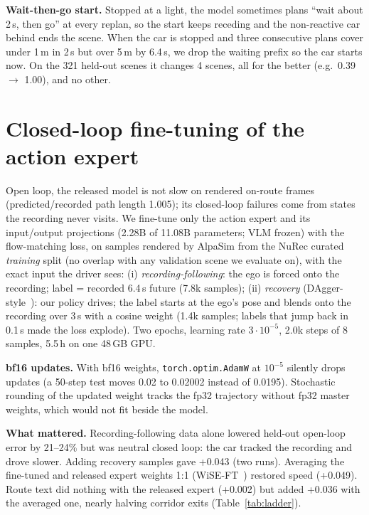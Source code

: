 \documentclass{article}
\begin{document}
\textbf{Wait-then-go start.} Stopped at a light, the model sometimes plans ``wait about 2\,s, then go'' at every replan,
so the start keeps receding and the non-reactive car behind ends the scene. When the car is stopped and three
consecutive plans cover under 1\,m in 2\,s but over 5\,m by 6.4\,s, we drop the waiting prefix so the car starts now.
On the 321 held-out scenes it changes 4 scenes, all for the better (e.g.\ 0.39 $\rightarrow$ 1.00), and no other.

\section{Closed-loop fine-tuning of the action expert}
Open loop, the released model is not slow on rendered on-route frames (predicted/recorded path length 1.005); its
closed-loop failures come from states the recording never visits. We fine-tune only the action expert and its
input/output projections (2.28B of 11.08B parameters; VLM frozen) with the flow-matching loss, on samples rendered by
AlpaSim from the NuRec curated \emph{training} split (no overlap with any validation scene we evaluate on), with the
exact input the driver sees:
(i) \emph{recording-following}: the ego is forced onto the recording; label = recorded 6.4\,s future (7.8k samples);
(ii) \emph{recovery} (DAgger-style~\cite{dagger}): our policy drives; the label starts at the ego's pose and blends onto
the recording over 3\,s with a cosine weight (1.4k samples; labels that jump back in 0.1\,s made the loss explode).
Two epochs, learning rate $3\cdot10^{-5}$, 2.0k steps of 8 samples, 5.5\,h on one 48\,GB GPU.

\textbf{bf16 updates.} With bf16 weights, \texttt{torch.optim.AdamW} at $10^{-5}$ silently drops updates (a 50-step
test moves 0.02 to 0.02002 instead of 0.0195). Stochastic rounding of the updated weight tracks the fp32 trajectory
without fp32 master weights, which would not fit beside the model.

\textbf{What mattered.} Recording-following data alone lowered held-out open-loop error by 21--24\% but was neutral
closed loop: the car tracked the recording and drove slower. Adding recovery samples gave +0.043 (two runs).
Averaging the fine-tuned and released expert weights 1:1 (WiSE-FT~\cite{wiseft}) restored speed (+0.049). Route text
did nothing with the released expert (+0.002) but added +0.036 with the averaged one, nearly halving corridor exits
(Table~\ref{tab:ladder}).
\end{document}
